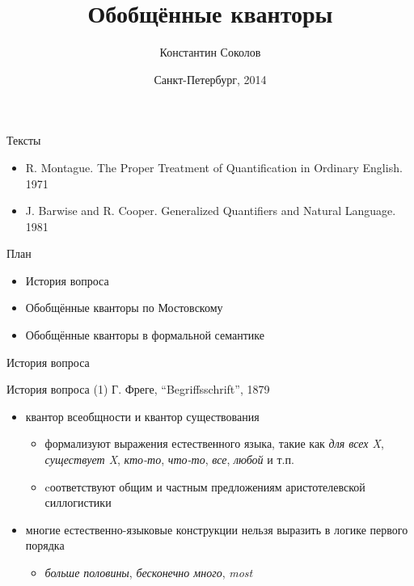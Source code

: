 \documentclass{beamer}
\begin{document}
\title{\Large{Обобщённые кванторы}}
\author{Константин Соколов}
\date{Санкт-Петербург, 2014} 
\begin{frame}
    \thispagestyle{empty}
    \titlepage
\end{frame}

\begin{frame}{Тексты}
\setcounter{framenumber}{1}
\begin{itemize}
    \item R. Montague. The Proper Treatment of Quantification in Ordinary English. 1971
	\item J. Barwise and R. Cooper. Generalized Quantifiers and Natural Language. 1981
\end{itemize}
\end{frame}

\begin{frame}{План}
\begin{itemize}
    \item История вопроса
	\item Обобщённые кванторы по Мостовскому
	\item Обобщённые кванторы в формальной семантике
\end{itemize}
\end{frame}

\begin{frame}{}
\begin{center}
История вопроса
\end{center}
\end{frame}

\begin{frame}{История вопроса (1)}
Г. Фреге, ``Begriffsschrift'', 1879
\bigskip
\begin{itemize}
	\item квантор всеобщности и квантор существования 
	    \medskip
	    \begin{itemize}
	        \item формализуют выражения естественного языка, такие как \textit{для всех X}, \textit{существует X}, \textit{кто-то}, \textit{что-то}, \textit{все}, \textit{любой} и т.п.
	        \medskip
        	\item cоответствуют общим и частным предложениям аристотелевской силлогистики
        \end{itemize}
    \bigskip
    \item многие естественно-языковые конструкции нельзя выразить в логике первого порядка
        \medskip
        \begin{itemize}
            \item \textit{больше половины}, \textit{бесконечно много}, \textit{most}
        \end{itemize}
\end{itemize}
\end{frame}
\end{document}
